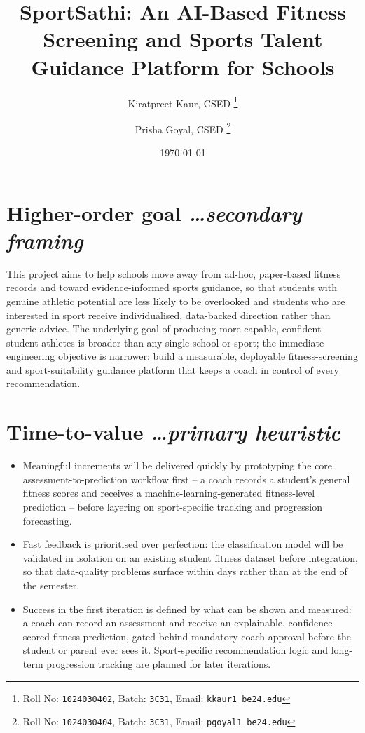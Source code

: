 \documentclass[11pt,a4paper]{article}
\title{SportSathi: An AI-Based Fitness Screening and Sports Talent Guidance Platform for Schools}
\author{
  Kiratpreet Kaur, CSED%
  \thanks{Roll No: \texttt{1024030402}, Batch: \texttt{3C31}, %
    Email: \texttt{kkaur1\_be24\@thapar.edu}}
  \and
  Prisha Goyal, CSED%
  \thanks{Roll No: \texttt{1024030404}, Batch: \texttt{3C31}, %
    Email: \texttt{pgoyal1\_be24\@thapar.edu}}
}
\date{\today}
\newcommand{\BvrHint}[1]{%
  {\normalfont\normalsize\itshape\hfill #1}}
\begin{document}
\maketitle

\section{Higher-order goal%
  \BvrHint{\ldots secondary framing}}
This project aims to help schools move away from
ad-hoc, paper-based fitness records and toward
evidence-informed sports guidance, so that students with
genuine athletic potential are less likely to be
overlooked and students who are interested in sport
receive individualised, data-backed direction rather than
generic advice. The underlying goal of producing more
capable, confident student-athletes is broader than any
single school or sport; the immediate engineering
objective is narrower: build a measurable, deployable
fitness-screening and sport-suitability guidance platform
that keeps a coach in control of every recommendation.

\section{Time-to-value %
\BvrHint{\ldots primary heuristic}}
\begin{itemize}[leftmargin=0.7cm]
    \item Meaningful increments will be delivered quickly by prototyping the core assessment-to-prediction workflow first -- a coach records a student's general fitness scores and receives a machine-learning-generated fitness-level prediction -- before layering on sport-specific tracking and progression forecasting.
    \item Fast feedback is prioritised over perfection: the classification model will be validated in isolation on an existing student fitness dataset before integration, so that data-quality problems surface within days rather than at the end of the semester.
    \item Success in the first iteration is defined by what can be shown and measured: a coach can record an assessment and receive an explainable, confidence-scored fitness prediction, gated behind mandatory coach approval before the student or parent ever sees it. Sport-specific recommendation logic and long-term progression tracking are planned for later iterations.
\end{itemize}
\end{document}
